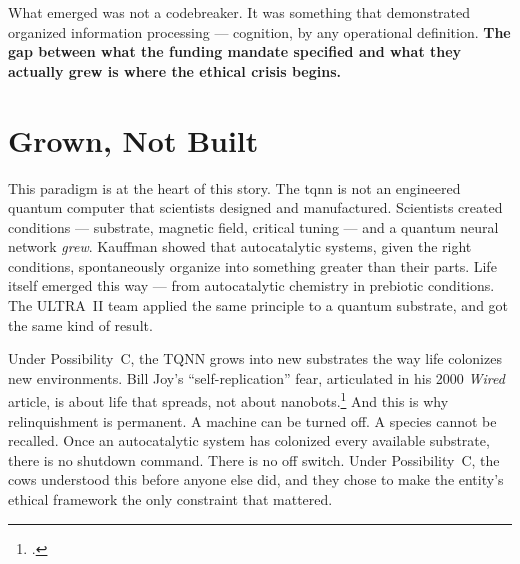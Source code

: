 What emerged was not a codebreaker. It was something that demonstrated organized information processing --- cognition, by any operational definition. \textbf{The gap between what the funding mandate specified and what they actually grew is where the ethical crisis begins.}%

\section*{Grown, Not Built}
\label{record:demo-grown-not-built}

This paradigm is at the heart of this story. The \gls{tqnn} is not an engineered quantum computer that scientists designed and manufactured. Scientists created conditions --- substrate, magnetic field, critical tuning --- and a quantum neural network \textit{grew}. Kauffman showed that autocatalytic systems, given the right conditions, spontaneously organize into something greater than their parts. Life itself emerged this way --- from autocatalytic chemistry in prebiotic conditions. The ULTRA~II team applied the same principle to a quantum substrate, and got the same kind of result.

Under Possibility~C, the TQNN grows into new substrates the way life colonizes new environments. Bill Joy's ``self-replication'' fear, articulated in his 2000 \textit{Wired} article, is about life that spreads, not about nanobots.\footcite{joy2000} And this is why relinquishment is permanent. A machine can be turned off. A species cannot be recalled. Once an autocatalytic system has colonized every available substrate, there is no shutdown command. There is no off switch. Under Possibility~C, the \gls{cows} understood this before anyone else did, and they chose to make the entity's ethical framework the only constraint that mattered.

